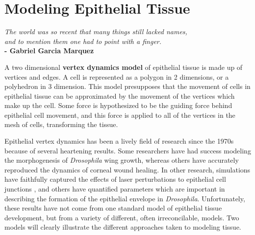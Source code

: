 \section{Modeling Epithelial Tissue} 
\label{sec:modeling}

\begin{center}
\emph{The world was so recent that many things still lacked names,}\\
\emph{and to mention them one had to point with a finger. }\\
\textbf{\hspace{10ex} - Gabriel Garcia Marquez}
\end{center}

A two dimensional \textbf{vertex dynamics model} of epithelial tissue is made up of vertices and edges\cite{DirichletDomains}. A cell is represented as a polygon in 2 dimensions, or a polyhedron in 3 dimension. This model presupposes that the movement of cells in epithelial tissue can be approximated by the movement of the vertices which make up the cell. Some force is hypothesized to be the guiding force behind epithelial cell movement, and this force is applied to all of the vertices in the mesh of cells, transforming the tissue.

Epithelial vertex dynamics has been a lively field of research since the 1970s because of several heartening results. Some researchers have had success modeling the morphogenesis of \emph{Drosophila} wing growth\cite{Farhadifar}, whereas others have accurately reproduced the dynamics of corneal wound healing\cite{WoundHealing}. In other research, simulations have faithfully captured the effects of laser perturbations to epithelial cell junctions \cite{Yoshi}, and others have quantified parameters which are important in describing the formation of the epithelial envelope in \emph{Drosophila}\cite{Sokolow}. Unfortunately, these results have not come from one standard model of epithelial tissue development, but from a variety of different, often irreconcilable, models. Two models will clearly illustrate the different approaches taken to modeling tissue. 

